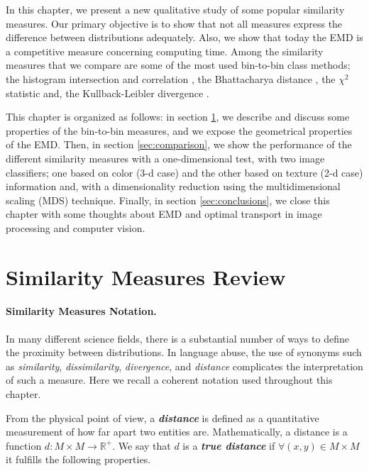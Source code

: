 In this chapter, we present a new qualitative study of some popular similarity measures. Our primary objective is to show that not all measures express the difference between distributions adequately. Also, we show that today the EMD is a competitive measure concerning computing time. Among the similarity measures that we compare are some of the most used bin-to-bin class methods; the histogram intersection and correlation \citep{Nejhum.Ho.ea:CVPR:2008}, the Bhattacharya distance \citep{So.Chung:JPR:2017}, the $\chi^2$ statistic and, the  Kullback-Leibler divergence \citep{Klein.Frintrop:CV:2011}. 

This chapter is organized as follows: in section \ref{sec:measures}, we describe and discuss some properties of the bin-to-bin measures, and we expose the geometrical properties of the EMD. Then, in section \ref{sec:comparison}, we show the performance of the different similarity measures with a one-dimensional test, with two image classifiers; one based on color (3-d case) and the other based on texture (2-d case) information and, with a dimensionality reduction using the multidimensional scaling (MDS) technique. Finally, in section \ref{sec:conclusions}, we close this chapter with some thoughts about EMD and optimal transport in image processing and computer vision.


\section{Similarity Measures Review}\label{sec:measures}

\paragraph{Similarity Measures Notation.}
In many different science fields, there is a substantial number of ways to define the proximity between distributions. In language abuse, the use of synonyms such as \textit{similarity}, \textit{dissimilarity}, \textit{divergence}, and \textit{distance} complicates the interpretation of such a measure. Here we recall a coherent notation used throughout this chapter.

From the physical point of view, a \textbf{\textit{distance}} is defined as a quantitative measurement of how far apart two entities are. Mathematically, a distance is a function $d : M \times M \rightarrow \mathbb{R}^+$. We say that $d$ is a \textbf{\textit{true distance}} if $\forall (x, y) \in M \times M$ it fulfills the following properties.

